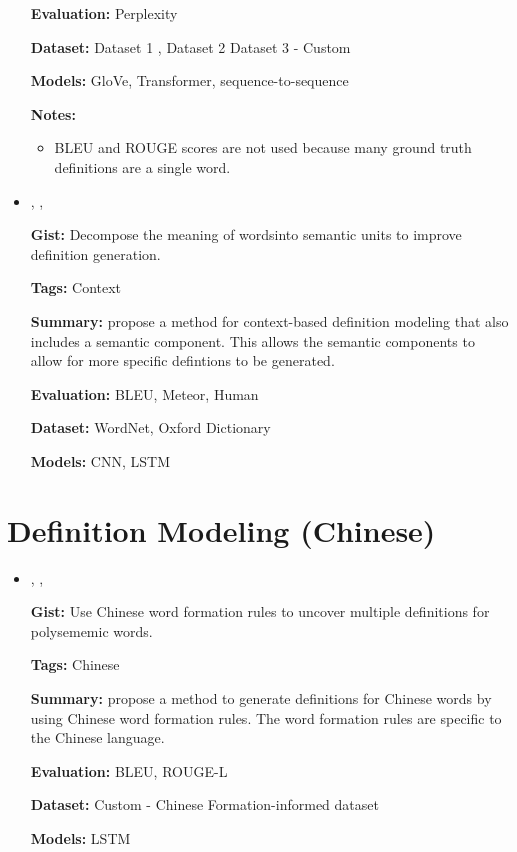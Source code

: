 \documentclass{article}[a4paper]
\newcommand{\bitem}[2]{
    \item[\cite{#1}]
        \citetitle{#1}, \citeauthor{#1}, \citeyear{#1}
        \newline
        {#2}
}%
\begin{document}
\begin{itemize}
{        \textbf{Evaluation:}
        Perplexity

        \textbf{Dataset:}
        Dataset 1 \cite{noraset_definition_2016},
        Dataset 2 \cite{gadetsky_conditional_2018}
        Dataset 3 - Custom

        \textbf{Models:}
        GloVe, Transformer, sequence-to-sequence

        \textbf{Notes:}
        \begin{itemize}
            \item BLEU and ROUGE scores are not used because many ground truth
                  definitions are a single word.
        \end{itemize}
    }%

    \bitem{li_explicit_2020}%
    {%
        \textbf{Gist:}
        Decompose the meaning of wordsinto semantic units to improve definition
        generation.

        \textbf{Tags:}
        Context

        \textbf{Summary:}
        \citeauthor{li_explicit_2020} propose a method for context-based
        definition modeling that also includes a semantic component. This allows
        the semantic components to allow for more specific defintions to be
        generated.

        \textbf{Evaluation:}
        BLEU, Meteor, Human

        \textbf{Dataset:}
        WordNet, Oxford Dictionary

        \textbf{Models:}
        CNN, LSTM
    }%
\end{itemize}

\section{Definition Modeling (Chinese)}
\begin{itemize}
    \bitem{zhu_multi_2019}%
    {%
        \textbf{Gist:}
        Use Chinese word formation rules to uncover multiple definitions for
        polysememic words.

        \textbf{Tags:}
        Chinese

        \textbf{Summary:}
        \citeauthor{zhu_multi_2019} propose a method to generate definitions for
        Chinese words by using Chinese word formation rules. The word formation
        rules are specific to the Chinese language.

        \textbf{Evaluation:}
        BLEU, ROUGE-L

        \textbf{Dataset:}
        Custom - Chinese Formation-informed dataset

        \textbf{Models:}
        LSTM
    }%
\end{itemize}
\end{document}
